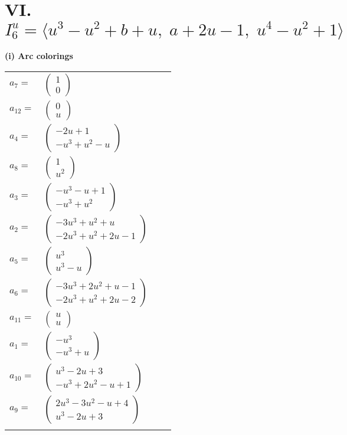 \documentclass[1p]{elsarticle_modified}
\theoremstyle{definition}
\begin{document}
\centering \section*{VI. $I^u_{6}= \langle u^3- u^2+b+u,\;a+2 u-1,\;u^4- u^2+1 \rangle$}
\flushleft \textbf{(i) Arc colorings}\\
\begin{tabular}{m{7pt} m{180pt} m{7pt} m{180pt} }
\flushright $a_{7}=$&$\begin{pmatrix}1\\0\end{pmatrix}$ \\
\flushright $a_{12}=$&$\begin{pmatrix}0\\u\end{pmatrix}$ \\
\flushright $a_{4}=$&$\begin{pmatrix}-2 u+1\\- u^3+u^2- u\end{pmatrix}$ \\
\flushright $a_{8}=$&$\begin{pmatrix}1\\u^2\end{pmatrix}$ \\
\flushright $a_{3}=$&$\begin{pmatrix}- u^3- u+1\\- u^3+u^2\end{pmatrix}$ \\
\flushright $a_{2}=$&$\begin{pmatrix}-3 u^3+u^2+u\\-2 u^3+u^2+2 u-1\end{pmatrix}$ \\
\flushright $a_{5}=$&$\begin{pmatrix}u^3\\u^3- u\end{pmatrix}$ \\
\flushright $a_{6}=$&$\begin{pmatrix}-3 u^3+2 u^2+u-1\\-2 u^3+u^2+2 u-2\end{pmatrix}$ \\
\flushright $a_{11}=$&$\begin{pmatrix}u\\u\end{pmatrix}$ \\
\flushright $a_{1}=$&$\begin{pmatrix}- u^3\\- u^3+u\end{pmatrix}$ \\
\flushright $a_{10}=$&$\begin{pmatrix}u^3-2 u+3\\- u^3+2 u^2- u+1\end{pmatrix}$ \\
\flushright $a_{9}=$&$\begin{pmatrix}2 u^3-3 u^2- u+4\\u^3-2 u+3\end{pmatrix}$\\&\end{tabular}
\end{document}
